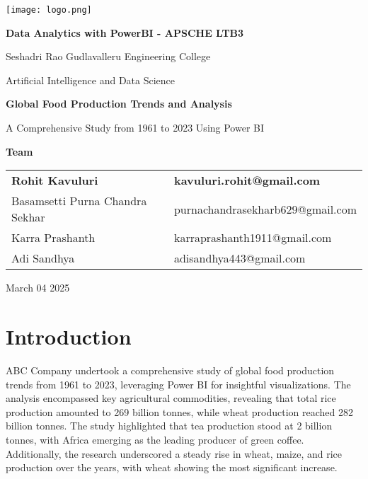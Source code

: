 \documentclass{article}
\begin{document}
\begin{titlepage}
    \centering
    \texttt{[image: logo.png]}
    \par\vspace{2cm}

    {\Large \textbf{Data Analytics with PowerBI - APSCHE LTB3} \par}
    \vspace{0.5cm}
    {\large Seshadri Rao Gudlavalleru Engineering College \par}
    {\large Artificial Intelligence and Data Science \par}
    \vspace{3cm}

    {\large \textbf{Global Food Production Trends and Analysis} \par}
    {\large A Comprehensive Study from 1961 to 2023 Using Power BI \par}
    \vspace{3cm}

    {\large \textbf{Team} \par}
    \vspace{0.5cm}
    \begin{tabular}{ll}
    \textbf{Rohit Kavuluri} & \textbf{kavuluri.rohit@gmail.com} \\
    Basamsetti Purna Chandra Sekhar & purnachandrasekharb629@gmail.com \\
    Karra Prashanth & karraprashanth1911@gmail.com \\
    Adi Sandhya & adisandhya443@gmail.com \\
    \end{tabular}
    \par\vspace{3cm}

    {\large March 04 2025 \par}
\end{titlepage}

\tableofcontents %

\newpage %

\section{Introduction}\label{sec:example}
ABC Company undertook a comprehensive study of global food production trends from 1961 to 2023, leveraging Power BI for insightful visualizations. The analysis encompassed key agricultural commodities, revealing that total rice production amounted to 269 billion tonnes, while wheat production reached 282 billion tonnes. The study highlighted that tea production stood at 2 billion tonnes, with Africa emerging as the leading producer of green coffee. Additionally, the research underscored a steady rise in wheat, maize, and rice production over the years, with wheat showing the most significant increase. \\
\end{document}
